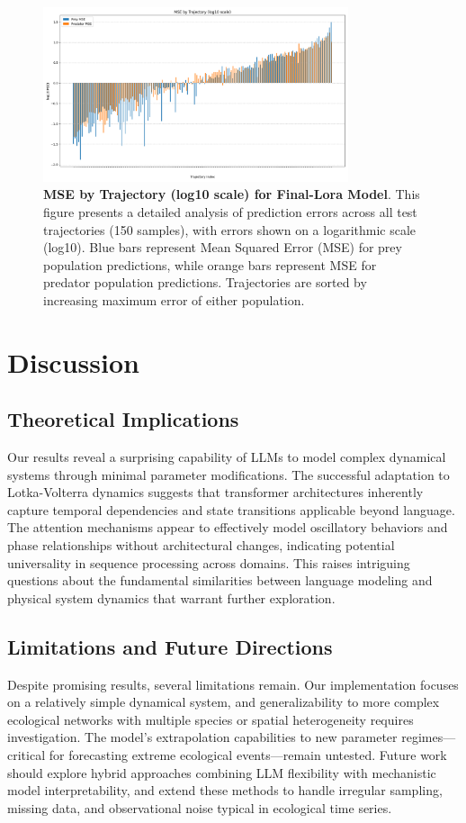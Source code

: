 \documentclass{article}
\begin{document}
\begin{figure}[H]
    \centering
    \includegraphics[width=0.8\textwidth]{trajectory_errors}
    \caption{\textbf{MSE by Trajectory (log10 scale) for Final-Lora Model}. This figure presents a detailed analysis of prediction errors across all test trajectories (150 samples), with errors shown on a logarithmic scale (log10). Blue bars represent Mean Squared Error (MSE) for prey population predictions, while orange bars represent MSE for predator population predictions. Trajectories are sorted by increasing maximum error of either population.}
    \label{fig:error_final_p2_trajectory}
\end{figure}

\section*{Discussion}
\subsection*{Theoretical Implications}
Our results reveal a surprising capability of LLMs to model complex dynamical systems through minimal parameter modifications. The successful adaptation to Lotka-Volterra dynamics suggests that transformer architectures inherently capture temporal dependencies and state transitions applicable beyond language. The attention mechanisms appear to effectively model oscillatory behaviors and phase relationships without architectural changes, indicating potential universality in sequence processing across domains. This raises intriguing questions about the fundamental similarities between language modeling and physical system dynamics that warrant further exploration.

\subsection*{Limitations and Future Directions}
Despite promising results, several limitations remain. Our implementation focuses on a relatively simple dynamical system, and generalizability to more complex ecological networks with multiple species or spatial heterogeneity requires investigation. The model's extrapolation capabilities to new parameter regimes—critical for forecasting extreme ecological events—remain untested. Future work should explore hybrid approaches combining LLM flexibility with mechanistic model interpretability, and extend these methods to handle irregular sampling, missing data, and observational noise typical in ecological time series.
\end{document}
